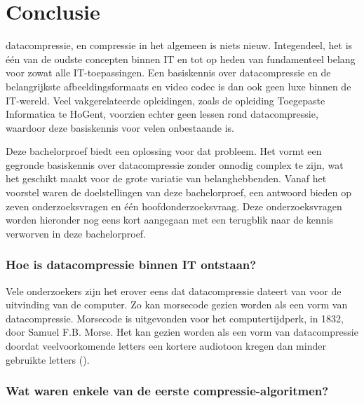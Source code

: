 
\chapter{Conclusie}
\label{ch:conclusie}

\Gls{datacompressie}, en compressie in het algemeen is niets nieuw. Integendeel, het is één van de oudste concepten binnen IT en tot op heden van fundamenteel belang voor zowat alle IT-toepassingen. Een basiskennis over \gls{datacompressie} en de belangrijkste \glspl{afbeeldingsformaat} en video \gls{codec} is dan ook geen luxe binnen de IT-wereld. Veel vakgerelateerde opleidingen, zoals de opleiding Toegepaste Informatica te HoGent, voorzien echter geen lessen rond \gls{datacompressie}, waardoor deze basiskennis voor velen onbestaande is.

Deze bachelorproef biedt een oplossing voor dat probleem. Het vormt een gegronde basiskennis over \gls{datacompressie} zonder onnodig complex te zijn, wat het geschikt maakt voor de grote variatie van belanghebbenden. Vanaf het voorstel waren de doelstellingen van deze bachelorproef, een antwoord bieden op zeven onderzoeksvragen en één hoofdonderzoeksvraag. Deze onderzoeksvragen worden hieronder nog eens kort aangegaan met een terugblik naar de kennis verworven in deze bachelorproef.

\subsection*{Hoe is datacompressie binnen IT ontstaan?}
\label{sec:conclussie-onderzoeksvraag-1}

Vele onderzoekers zijn het erover eens dat \gls{datacompressie} dateert van voor de uitvinding van de computer. Zo kan morsecode gezien worden als een vorm van \gls{datacompressie}. Morsecode is uitgevonden voor het computertijdperk, in 1832, door Samuel F.B. Morse. Het kan gezien worden als een vorm van datacompressie doordat veelvoorkomende letters een kortere audiotoon kregen dan minder gebruikte letters (\cite{morsecode}).

\subsection*{Wat waren enkele van de eerste compressie-algoritmen?}
\label{sec:conclussie-onderzoeksvraag-2}

